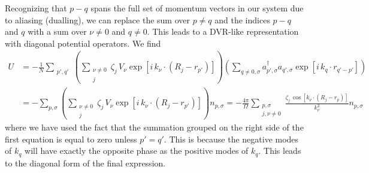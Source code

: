 \documentclass[superscriptaddress,aps,pra,nofootinbib,notitlepage,10pt,longbibliography]{revtex4-1}
\begin{document}
Recognizing that $p - q$ spans the full set of momentum vectors in our system due to aliasing (dualling), we can replace the sum over $p \neq q$ and the indices $p-q$ and $q$ with a sum over $\nu \neq 0$ and $q \neq 0$. This leads to a DVR-like representation
with diagonal  potential operators.
We find
\begin{align}
\label{eq:pwd_u}
U & =  -\frac{1}{N} \sum_{\substack{p', q'}}  \left(\sum_{\substack{\nu \neq 0 \\ j}} \zeta_j \, V_{\nu} \exp\left[i \, k_{\nu} \cdot \left(R_j - r_{p'}\right)\right]\right)
\left( \sum_{q\neq 0, \sigma} a_{p', \sigma}^\dagger a_{q',\sigma} \exp\left[i \, k_q \cdot r_{q'-p'}\right] \right)\\
%
& =  - \sum_{p,\sigma} \left(\sum_{\substack{\nu \neq 0 \\ j}} \zeta_j \, V_{\nu} \exp\left[i \, k_{\nu} \cdot \left(R_j - r_{p'}\right)\right]\right) n_{p, \sigma}
%
= - \frac{4 \pi}{\Omega} \sum_{\substack{p,\sigma \\ j, \nu\neq 0}} \frac{\zeta_j \, \cos\left[k_{\nu} \cdot \left(R_j - r_{p}\right)\right]}{k_\nu^2} n_{p, \sigma} \nonumber
%
\end{align}
where we have used the fact that the summation grouped on the right side of the first equation is equal to zero unless $p' = q'$. This is because the negative modes of $k_q$ will have exactly the opposite phase as the positive modes of $k_q$. This leads to the
diagonal form of the final expression.
\end{document}
